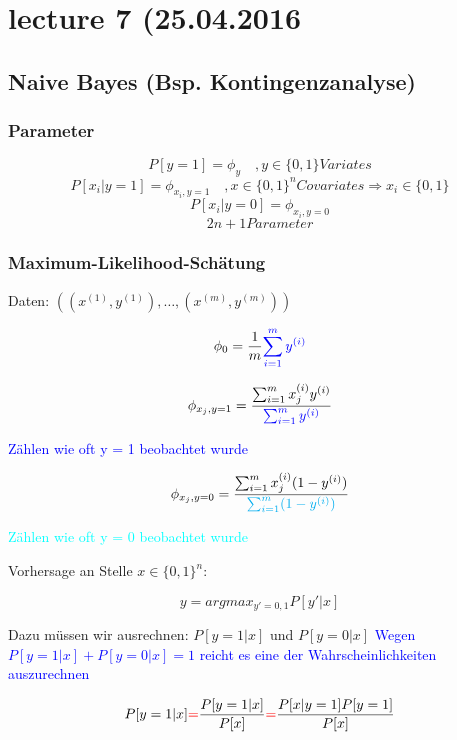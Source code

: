 \newcommand{\xj}[1]{\phi_{x_j, y=#1}}

\section*{lecture 7 (25.04.2016}
\subsection{Naive Bayes (Bsp. Kontingenzanalyse)}
	\subsubsection*{Parameter}
		\[ P[y=1] = \phi_y \quad, y \in \{0,1\} Variates\]
		\[ P[x_i|y=1] = \phi_{x_i, y = 1} \quad, x \in \{0,1\}^n Covariates  \Rightarrow x_i \in \{0,1\}\]
		\[ P[x_i|y=0] = \phi_{x_i, y = 0}\]
		\[2n + 1 Parameter \]
	
	\subsubsection*{Maximum-Likelihood-Schätung}
	
		Daten: $ ((x^{(1)},y^{(1)}),\dots,(x^{(m)},y^{(m)}) ) $
		
		\[ \phi_0 = \frac{1}{m} \textcolor{blue}{\sum_{i = 1}^{m} y^{(i)}}\]
		
		\[ \xj{1} = \frac{\sum_{i=1}^{m} x_j ^{(i)} y^{(i)}}{\textcolor{blue}{\sum_{i=1}^{m}y^{(i)}}} \]
			
			\textcolor{blue}{Zählen wie oft y = 1 beobachtet wurde}
			
		\[ \xj{0} =  \frac{\sum_{i=1}^{m} x_j ^{(i)} (1- y^{(i)})}{\textcolor{cyan}{\sum_{i=1}^{m}(1- y^{(i)})}} \]
		
			\textcolor{cyan}{Zählen wie oft y = 0 beobachtet wurde}
			
		Vorhersage an Stelle $ x \in \{0,1\}^n $:
		
		\begin{framed}
			\[ y = argmax_{y' = 0,1} P[y'|x] \]
		\end{framed}
		
		Dazu müssen wir ausrechnen: $ P[y = 1|x] $ und $ P[y = 0|x] $
		\textcolor{blue}{Wegen $ P[y = 1|x] + P[y = 0|x] = 1$ reicht es eine der Wahrscheinlichkeiten auszurechnen} 
		
		\[ P[y = 1|x] \textcolor{red}{=} \frac{P[y = 1|x]}{P[x]} \textcolor{red}{=} \frac{P[x| y = 1]P[y = 1]}{P[x]} \]
		
